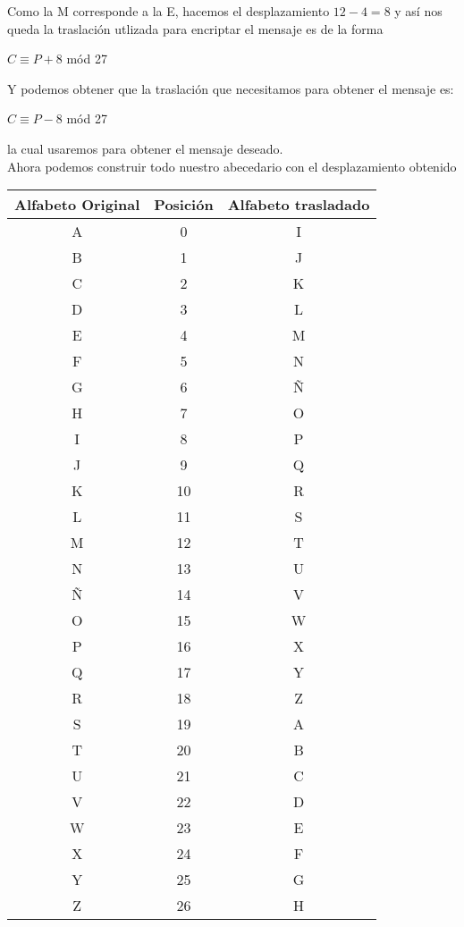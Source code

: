 \documentclass[12pt]{article}
\begin{document}
Como la M corresponde a la E, hacemos el desplazamiento $12 - 4 = 8$ y así nos queda la traslación utlizada para encriptar el mensaje es de la forma 
\begin{center}
    $C \equiv P + 8$ mód 27
\end{center} 

Y podemos obtener que la traslación que necesitamos para obtener el mensaje es:

\begin{center}
    $C \equiv P - 8$ mód 27
\end{center} 

la cual usaremos para obtener el mensaje deseado. \\

Ahora podemos construir todo nuestro abecedario con el desplazamiento obtenido 

\begin{center}
    \begin{tabular}{ |c|c|c|}
        \hline
            Alfabeto Original & Posición & Alfabeto trasladado \\
        \hline
        A & 0 & I \\
        B & 1 & J \\
        C & 2 & K \\
        D & 3 & L \\
        E & 4 & M \\
        F & 5 & N \\
        G & 6 & Ñ \\
        H & 7 & O \\
        I & 8 & P \\
        J & 9 & Q \\
        K & 10 & R \\ 
        L & 11 & S \\ 
        M & 12 & T \\ 
        N & 13 & U \\
        Ñ & 14 & V \\
        O & 15 & W \\
        P & 16 & X \\
        Q & 17 & Y \\
        R & 18 & Z \\
        S & 19 & A \\
        T & 20 & B \\
        U & 21 & C \\
        V & 22 & D \\
        W & 23 & E \\
        X & 24 & F \\
        Y & 25 & G \\
        Z & 26 & H \\
        \hline 
    \end{tabular}
\end{center}
\end{document}
